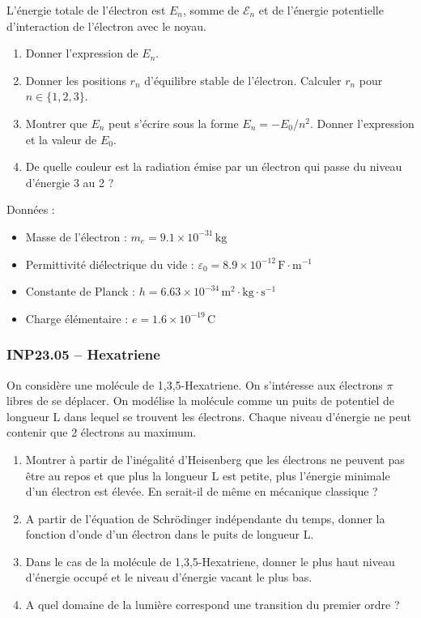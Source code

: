L'énergie totale de l'électron est $E_{n}$, somme de $\mathcal{E}_{n}$ et de l'énergie potentielle d'interaction de l'électron avec le noyau.

\begin{enumerate}[resume]
\item Donner l'expression de $E_{n}$.
\item Donner les positions $r_{n}$ d'équilibre stable de l'électron. Calculer $r_{n}$ pour $n \in \{1,2,3\}$.
\item Montrer que $E_{n}$ peut s'écrire sous la forme $E_{n} = -E_{0}/n^{2}$. Donner l'expression et la valeur de $E_{0}$.
\item De quelle couleur est la radiation émise par un électron qui passe du niveau d'énergie 3 au 2 ?
\end{enumerate}

Données :
\begin{itemize}
\item Masse de l'électron : $m_{e} = 9.1 \times 10^{-31}\,\text{kg}$
\item Permittivité diélectrique du vide : $\varepsilon_{0} = 8.9 \times 10^{-12}\,\text{F}\cdot\text{m}^{-1}$
\item Constante de Planck : $h = 6.63 \times 10^{-34}\,\text{m}^{2}\cdot\text{kg}\cdot\text{s}^{-1}$
\item Charge élémentaire : $e = 1.6 \times 10^{-19}\,\text{C}$
\end{itemize}

\newpage
\subsubsection*{INP23.05 -- Hexatriene }

\begin{center}
\end{center}

On considère une molécule de 1,3,5-Hexatriene. On s'intéresse aux électrons $\pi$ libres de se déplacer. On modélise la molécule comme un puits de potentiel de longueur L dans lequel se trouvent les électrons. Chaque niveau d'énergie ne peut contenir que 2 électrons au maximum.

\begin{enumerate}
\item Montrer à partir de l'inégalité d'Heisenberg que les électrons ne peuvent pas être au repos et que plus la longueur L est petite, plus l'énergie minimale d'un électron est élevée. En serait-il de même en mécanique classique ?
\item A partir de l'équation de Schrödinger indépendante du temps, donner la fonction d'onde d'un électron dans le puits de longueur L.
\item Dans le cas de la molécule de 1,3,5-Hexatriene, donner le plus haut niveau d'énergie occupé et le niveau d'énergie vacant le plus bas.
\item A quel domaine de la lumière correspond une transition du premier ordre ?
\end{enumerate}

